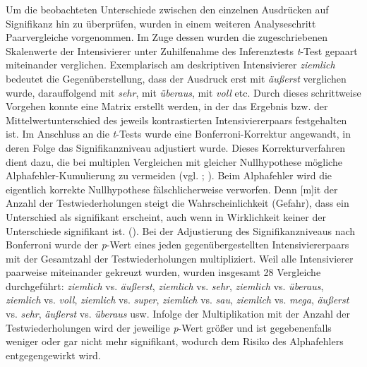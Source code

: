 Um die beobachteten Unterschiede zwischen den einzelnen Ausdrücken auf Signifikanz hin zu überprüfen, wurden in einem weiteren Analyseschritt Paarvergleiche vorgenommen. Im Zuge dessen wurden die zugeschriebenen Skalenwerte der Intensivierer unter Zuhilfenahme des Inferenztests \textit{t}-Test gepaart miteinander verglichen. Exemplarisch am deskriptiven Intensivierer \textit{ziemlich} bedeutet die Gegenüberstellung, dass der Ausdruck erst mit \textit{äußerst} verglichen wurde, darauffolgend mit \textit{sehr}, mit \textit{überaus}, mit \textit{voll} etc. Durch dieses schrittweise Vorgehen konnte eine Matrix erstellt werden, in der das Ergebnis bzw. der Mittelwertunterschied des jeweils kontrastierten Intensiviererpaars festgehalten ist. Im Anschluss an die \textit{t}-Tests wurde eine Bonferroni-Korrektur angewandt, in deren Folge das Signifikanzniveau adjustiert wurde. Dieses Korrekturverfahren dient dazu, die bei multiplen Vergleichen mit gleicher Nullhypothese mögliche Alphafehler-Kumulierung zu vermeiden (vgl. {\citealt[249]{Wollschlaeger.2017}}; \citealt[176f.]{Winter.2020}). Beim Alphafehler wird die eigentlich korrekte Nullhypothese fälschlicherweise verworfen. Denn \glqq{}[m]it der Anzahl der Testwiederholungen steigt die Wahrscheinlichkeit (Gefahr), dass ein Unterschied als signifikant erscheint, auch wenn in Wirklichkeit keiner der Unterschiede signifikant ist.\grqq{} ({\citealt[186]{Backhaus.2018}}). Bei der Adjustierung des Signifikanzniveaus nach Bonferroni wurde der \textit{p}-Wert eines jeden gegenübergestellten Intensiviererpaars mit der Gesamtzahl der Testwiederholungen  multipliziert. Weil alle Intensivierer paarweise miteinander gekreuzt wurden, wurden insgesamt 28 Vergleiche durchgeführt: \textit{ziemlich} vs. \textit{äußerst}, \textit{ziemlich} vs. \textit{sehr}, \textit{ziemlich} vs. \textit{überaus}, \textit{ziemlich} vs. \textit{voll}, \textit{ziemlich} vs. \textit{super}, \textit{ziemlich} vs. \textit{sau}, \textit{ziemlich} vs. \textit{mega}, \textit{äußerst} vs. \textit{sehr}, \textit{äußerst} vs. \textit{überaus} usw. Infolge der Multiplikation mit der Anzahl der Testwiederholungen wird der jeweilige \textit{p}-Wert größer und ist gegebenenfalls weniger oder gar nicht mehr signifikant, wodurch dem Risiko des Alphafehlers {entgegengewirkt wird}.


